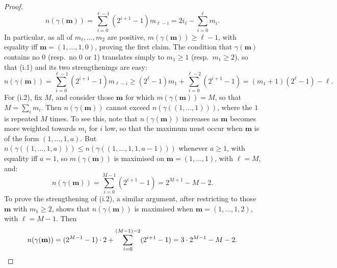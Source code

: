 \documentclass[10pt]{article}
\newcommand{\minDim}{m}
\begin{document}
\begin{KoszulSequenceCombinatorics}
\begin{proof}
\[n(\gamma(\textbf{m}))=\sum_{i=0}^{\ell-1}\left(2^{i+1}-1\right)m_{\ell-i}=2i_\ell-\sum_{i=0}^\ell m_i.\]
In particular, as all of $m_\ell,\ldots,m_2$ are positive, $\minDim(\gamma(\textbf{m}))\geq\ell-1$, with equality iff $\textbf{m}=(1,\ldots,1,0)$, proving the first claim.
The condition that $\gamma(\textbf{m})$ contains no 0 (resp.\ no 0 or 1) translates simply to $m_1\geq1$ (resp.\ $m_1\geq2$), so that \textup{(i.1)} and its two strengthenings are easy:
\[n(\gamma(\textbf{m}))=\sum_{i=0}^{\ell-1}\left(2^{i+1}-1\right)m_{\ell-i}\geq(2^{\ell}-1)m_1+ \sum_{i=0}^{\ell-2}\left(2^{i+1}-1\right)
=(m_1+1)(2^{\ell}-1)-\ell.\]
For \textup{(i.2)}, fix $M$, and consider those $\textbf{m}$ for which $\minDim(\gamma(\textbf{m}))=M$, so that $M=\sum_im_i$. Then $n(\gamma(\textbf{m}))$ cannot exceed $n(\gamma((1,\ldots,1)))$, where the $1$ is repeated $M$ times. To see this, note that $n(\gamma(\textbf{m}))$ increases as $\textbf{m}$ becomes more weighted towards $m_i$ for $i$ low, so that the maximum must occur when $\textbf{m}$ is of the form $(1,\ldots,1,a)$. But $n(\gamma((1,\ldots,1,a)))\leq n(\gamma((1,\ldots,1,1,a-1)))$ whenever $a\geq1$, with equality iff $a=1$, so $\minDim(\gamma(\textbf{m}))$ is maximised on $\textbf{m}=(1,\ldots,1)$, with $\ell=M$, and:
\[n(\gamma(\textbf{m}))=\sum_{i=0}^{M-1}(2^{i+1}-1)=2^{M+1}-M-2.\]
To prove the strengthening of \textup{(i.2)}, a similar argument, after restricting to those $\textbf{m}$ with $m_1\geq2$, shows that $n(\gamma(\textbf{m}))$ is maximised when $\textbf{m}=(1,\ldots,1,2)$, with $\ell=M-1$. Then
\[n(\gamma(\textbf{m}))=(2^{M-1}-1)\cdot2+\sum_{i=0}^{(M-1)-2}(2^{i+1}-1)=3\cdot2^{M-1}-M-2.\qedhere\]
\end{proof}
%

\end{KoszulSequenceCombinatorics}
\end{document}
